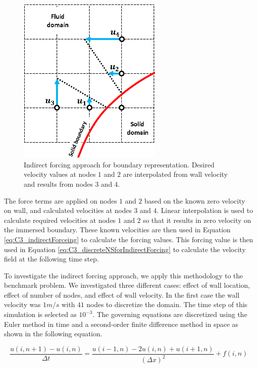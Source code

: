 \begin{figure}[H]
	\centering
	\includegraphics[width=7.00cm]{Chapter_3/figure/indirect_forcing_approach.png}
	\caption{Indirect forcing approach for boundary representation. Desired velocity values at nodes $1$ and $2$ are interpolated from wall velocity and results from nodes $3$ and $4$.}
	\label{fig:C3_indiredctForcingMethod}
\end{figure}

The force terms are applied on nodes $1$ and $2$ based on the known zero velocity on wall, and calculated velocities at nodes $3$ and $4$. Linear interpolation is used to calculate required velocities at nodes $1$ and $2$ so that it results in zero velocity on the immersed boundary. These known velocities are then used in Equation \ref{eq:C3_indirectForceing} to calculate the forcing values. This forcing value is then used in Equation \ref{eq:C3_discreteNSforIndirectForcing} to calculate the velocity field at the following time step.

To investigate the indirect forcing approach, we apply this methodology to the benchmark problem. We investigated three different cases: effect of wall location, effect of number of nodes, and effect of wall velocity. In the first case the wall velocity was $1 m/s$ with $41$ nodes to discretize the domain. The time step of this simulation is selected as $10^{-3}$. The governing equations are discretized using the Euler method in time and a second-order finite difference method in space as shown in the following equation.

\begin{equation}
	\frac{u(i, n+1) - u(i, n)}{\Delta t} = \frac{u(i - 1, n) - 2u(i, n) + u(i + 1, n)}{(\Delta x)^2} + f(i, n)
\end{equation}

